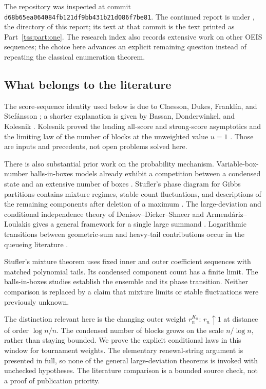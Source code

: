 \documentclass[11pt]{article}
\theoremstyle{remark}\newtheorem{remark}[theorem]{Remark}
\theoremstyle{definition}\newtheorem{definition}[theorem]{Definition}
\begin{document}
The repository was inspected at commit
\texttt{d68b65ea064084fb121df9bb431b21d086f7be81}.
The continued report is under
,
the directory of this report; its text at that commit is the text printed
as Part~\ref{tss:part:one}.
The research index also records extensive work on other OEIS sequences;
the choice here advances an explicit remaining question instead of
repeating the classical enumeration theorem.

\subsection{What belongs to the literature}
The score-sequence identity used below is due to Claesson, Dukes,
Frankl\'in, and Stef\'ansson \cite{CDFS}; a shorter explanation is given
by Bassan, Donderwinkel, and Kolesnik \cite{BDK}. Kolesnik proved the
leading all-score and strong-score asymptotics and the limiting law of
the number of blocks at the unweighted value $u=1$ \cite{Kolesnik}.
Those are inputs and precedents, not open problems solved here.

There is also substantial prior work on the probability mechanism.
Variable-box-number balls-in-boxes models already exhibit a competition
between a condensed state and an extensive number of boxes
\cite{BBBJ}. Stufler's phase diagram for Gibbs partitions contains
mixture regimes, stable count fluctuations, and descriptions of the
remaining components after deletion of a maximum \cite{Stufler}.
The large-deviation and conditional independence theory of
Denisov--Dieker--Shneer and Armend\'ariz--Loulakis gives a general
framework for a single large summand \cite{DDS,AL}.
Logarithmic transitions between geometric-sum and heavy-tail
contributions occur in the queueing literature \cite{OCBG}.

Stufler's mixture theorem uses fixed inner and outer coefficient
sequences with matched polynomial tails. Its condensed component count
has a finite limit. The balls-in-boxes studies establish the ensemble
and its phase transition. Neither comparison is replaced by a claim
that mixture limits or stable fluctuations were previously unknown.

The distinction relevant here is the changing outer weight
$r_n^{K_n}$: $r_n\uparrow1$ at distance of order $\log n/n$.
The condensed number of blocks grows on the scale $n/\log n$, rather
than staying bounded. We prove the explicit conditional laws in this
window for tournament weights. The elementary renewal-string argument
is presented in full, so none of the general large-deviation theorems
is invoked with unchecked hypotheses. The literature comparison is a
bounded source check, not a proof of publication priority.
\end{document}
